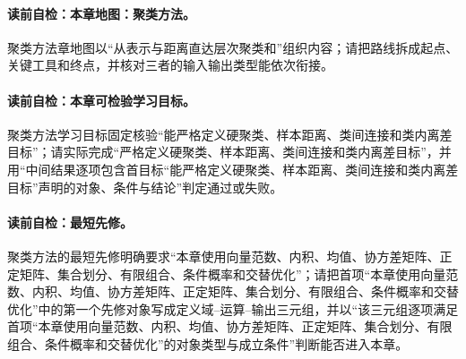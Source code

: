 \paragraph{读前自检：本章地图：聚类方法。}聚类方法章地图以“从表示与距离直达层次聚类和\kMeans”组织内容；请把路线拆成起点、关键工具和终点，并核对三者的输入输出类型能依次衔接。\par

\label{struct:V4-C02-CH01}
\paragraph{读前自检：本章可检验学习目标。}聚类方法学习目标固定核验“能严格定义硬聚类、样本距离、类间连接和类内离差目标”；请实际完成“严格定义硬聚类、样本距离、类间连接和类内离差目标”，并用“中间结果逐项包含首目标“能严格定义硬聚类、样本距离、类间连接和类内离差目标”声明的对象、条件与结论”判定通过或失败。\par


\label{struct:V4-C02-CH02}
\paragraph{读前自检：最短先修。}聚类方法的最短先修明确要求“本章使用向量范数、内积、均值、协方差矩阵、正定矩阵、集合划分、有限组合、条件概率和交替优化”；请把首项“本章使用向量范数、内积、均值、协方差矩阵、正定矩阵、集合划分、有限组合、条件概率和交替优化”中的第一个先修对象写成定义域--运算--输出三元组，并以“该三元组逐项满足首项“本章使用向量范数、内积、均值、协方差矩阵、正定矩阵、集合划分、有限组合、条件概率和交替优化”的对象类型与成立条件”判断能否进入本章。\par

